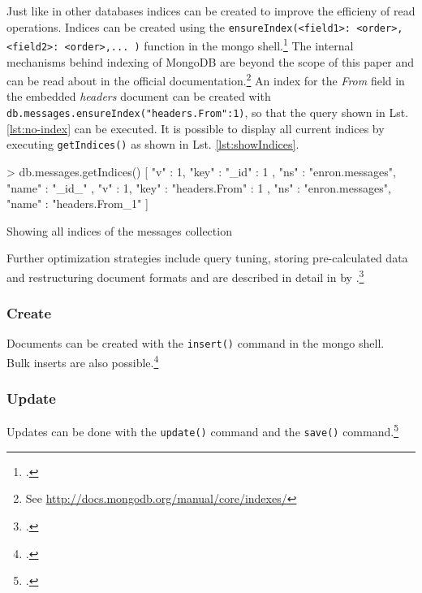 Just like in other databases indices can be created to improve the efficieny of
read operations. Indices can be created using the \texttt{ensureIndex({<field1>: <order>, <field2>: <order>,... })}
function in the mongo shell.\footcite[Cf.][12]{mongo_crud_manual}
The internal mechanisms behind indexing of MongoDB are beyond the scope of this paper and can be
read about in the official documentation.\footnote{See \url{http://docs.mongodb.org/manual/core/indexes/}}
An index for the \textit{From} field in the embedded \textit{headers} document can be created with
\texttt{db.messages.ensureIndex({"headers.From":1})}, so that the
query shown in Lst. \ref{lst:no-index} can be executed. It is possible to display all current indices
by executing \texttt{getIndices()} as shown in Lst. \ref{lst:showIndices}.

\begin{listing}
    \begin{javascriptcode}
> db.messages.getIndices()
[   {
        "v" : 1,
        "key" : { "_id" : 1 },
        "ns" : "enron.messages",
        "name" : "_id_"
    },
    {
        "v" : 1,
        "key" : { "headers.From" : 1 },
        "ns" : "enron.messages",
        "name" : "headers.From_1"
    } ]
    \end{javascriptcode}
    \caption{Showing all indices of the messages collection}
    \label{lst:showIndices}
\end{listing}

Further optimization strategies include query tuning, storing pre-calculated
data and restructuring document formats and are described in detail in
 by
\citeauthor{Chodorow_2011_tips}.\footcite[Cf.][]{Chodorow_2011_tips}

\FloatBarrier
\subsubsection{Create}
Documents can be created with the \texttt{insert()} command in the mongo
shell.\\
Bulk inserts are also possible.\footcite[Cf.][p. 53 et sqq.]{mongo_crud_manual}

\subsubsection{Update}
Updates can be done with the \texttt{update()} command and the \texttt{save()}
command.\footcite[Cf.][p. 75 et. sqq.]{mongo_crud_manual}



